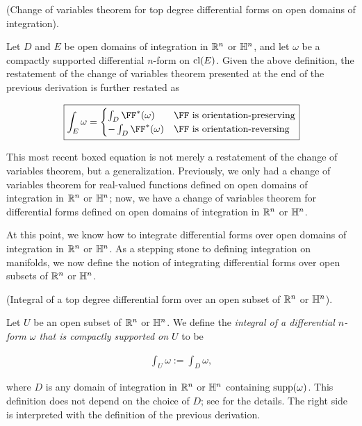 \begin{theorem}
     (Change of variables theorem for top degree differential forms on open domains of integration).
    
    Let $D$ and $E$ be open domains of integration in $\mathbb{R}^n$ or $\mathbb{H}^n$, and let $\omega$ be a compactly supported differential $n$-form on $\text{cl}(E)$. Given the above definition, the restatement of the change of variables theorem presented at the end of the previous derivation is further restated as
    
    \begin{align*}
        \boxed
        {
            \int_E \omega
            =
            \begin{cases}
                \int_D \FF^*(\omega) & \text{$\FF$ is orientation-preserving} \\
                -\int_D \FF^*(\omega) & \text{$\FF$ is orientation-reversing}
            \end{cases}
        }
    \end{align*}
    
    This most recent boxed equation is not merely a restatement of the change of variables theorem, but a generalization. Previously, we only had a change of variables theorem for real-valued functions defined on open domains of integration in $\mathbb{R}^n$ or $\mathbb{H}^n$; now, we have a change of variables theorem for differential forms defined on open domains of integration in $\mathbb{R}^n$ or $\mathbb{H}^n$.
\end{theorem}

At this point, we know how to integrate differential forms over open domains of integration in $\mathbb{R}^n$ or $\mathbb{H}^n$. As a stepping stone to defining integration on manifolds, we now define the notion of integrating differential forms over open subsets of $\mathbb{R}^n$ or $\mathbb{H}^n$.

\begin{defn}
    \label{ch::diff_forms::defn::integral_over_open_subset}
    
     (Integral of a top degree differential form over an open subset of $\mathbb{R}^n$ or $\mathbb{H}^n$).
    
    Let $U$ be an open subset of $\mathbb{R}^n$ or $\mathbb{H}^n$. We define the \textit{integral of a differential $n$-form $\omega$ that is compactly supported on $U$} to be
    
    \begin{align*}
        \int_U \omega := \int_D \omega,
    \end{align*}
    
    where $D$ is any domain of integration in $\mathbb{R}^n$ or $\mathbb{H}^n$ containing $\text{supp}(\omega)$. This definition does not depend on the choice of $D$; see \cite[p. 403]{book::SM} for the details. The right side is interpreted with the definition of the previous derivation. 
\end{defn}

